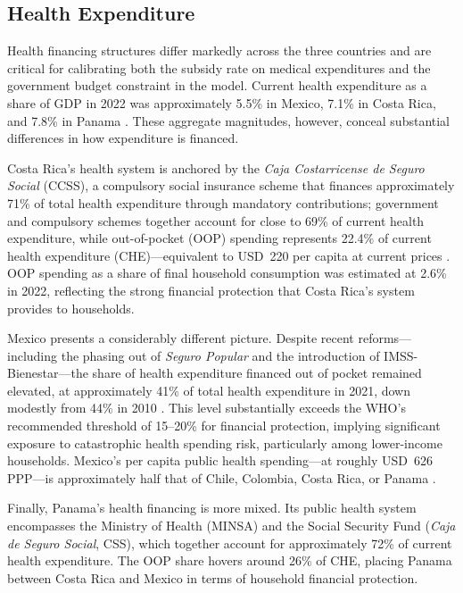 \documentclass[12pt,a4paper]{article}
\begin{document}
\subsection{Health Expenditure}\label{subsec:health_exp}

Health financing structures differ markedly across the three countries
and are critical for calibrating both the subsidy rate on medical
expenditures and the government budget constraint in the model. Current
health expenditure as a share of GDP in 2022 was approximately 5.5\%
in Mexico, 7.1\% in Costa Rica, and 7.8\% in Panama \citep{WHOGHED2024}.
These aggregate magnitudes, however, conceal substantial differences in
how expenditure is financed.

Costa Rica's health system is anchored by the \textit{Caja
Costarricense de Seguro Social} (CCSS), a compulsory social insurance
scheme that finances approximately 71\% of total health expenditure
through mandatory contributions; government and compulsory schemes
together account for close to 69\% of current health expenditure, while
out-of-pocket (OOP) spending represents 22.4\% of current health
expenditure (CHE)---equivalent to USD~220 per capita at current prices
\citep{OECDHaG2023, WHOGHO2024}. OOP spending as a share of final
household consumption was estimated at 2.6\% in 2022, reflecting the
strong financial protection that Costa Rica's system provides to
households.

Mexico presents a considerably different picture. Despite recent
reforms---including the phasing out of \textit{Seguro Popular} and the
introduction of IMSS-Bienestar---the share of health expenditure
financed out of pocket remained elevated, at approximately 41\% of
total health expenditure in 2021, down modestly from 44\% in 2010
\citep{WHOGHED2024}. This level substantially exceeds the WHO's
recommended threshold of 15--20\% for financial protection, implying
significant exposure to catastrophic health spending risk, particularly
among lower-income households. Mexico's per capita public health
spending---at roughly USD~626 PPP---is approximately half that of
Chile, Colombia, Costa Rica, or Panama \citep{OECDHaG2023}.

Finally, Panama's health financing is more mixed. Its public health system
encompasses the Ministry of Health (MINSA) and the Social Security Fund
(\textit{Caja de Seguro Social}, CSS), which together account for
approximately 72\% of current health expenditure. The OOP share hovers
around 26\% of CHE, placing Panama between Costa Rica and Mexico in
terms of household financial protection.
\end{document}
